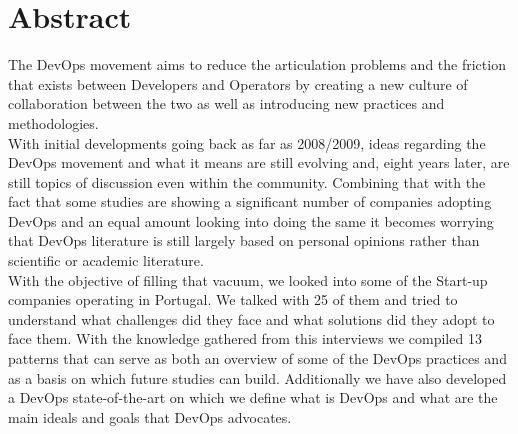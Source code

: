 \chapter*{Abstract}

The DevOps movement aims to reduce the articulation problems and the friction that exists between Developers and Operators by creating a new culture of collaboration between the two as well as introducing new practices and methodologies. \\
With initial developments going back as far as 2008/2009, ideas regarding the DevOps movement and what it means are still evolving and, eight years later, are still topics of discussion even within the community. Combining that with the fact that some studies are showing a significant number of companies adopting DevOps and an equal amount looking into doing the same it becomes worrying that DevOps literature is still largely based on personal opinions rather than scientific or academic literature.\\
With the objective of filling that vacuum, we looked into some of the Start-up companies operating in Portugal. We talked with 25 of them and tried to understand what challenges did they face and what solutions did they adopt to face them. With the knowledge gathered from this interviews we compiled 13 patterns that can serve as both an overview of some of the DevOps practices and as a basis on which future studies can build. Additionally we have also developed a DevOps state-of-the-art on which we define what is DevOps and what are the main ideals and goals that DevOps advocates.
